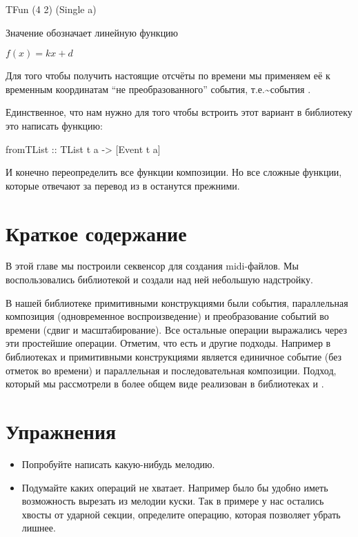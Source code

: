 \begin{code}
TFun (4 2) (Single a)
\end{code}

Значение  обозначает линейную функцию

$f(x) = k x + d$

Для того чтобы получить настоящие отсчёты по времени мы применяем её к
временным координатам ``не преобразованного'' события,
т.е.\textasciitilde{}события .

Единственное, что нам нужно для того чтобы встроить этот вариант в
библиотеку это написать функцию:


\begin{code}
fromTList :: TList t a -> [Event t a]
\end{code}

И конечно переопределить все функции композиции. Но все сложные функции,
которые отвечают за перевод из  в  останутся
прежними.

\section{Краткое содержание}

В этой главе мы построили секвенсор для создания midi-файлов. Мы
воспользовались библиотекой  и создали над ней небольшую
надстройку.

В нашей библиотеке примитивными конструкциями были события, параллельная
композиция (одновременное воспроизведение) и преобразование событий во
времени (сдвиг и масштабирование). Все остальные операции выражались
через эти простейшие операции. Отметим, что есть и другие подходы.
Например в библиотеках  и  примитивными
конструкциями является единичное событие (без отметок во времени) и
параллельная и последовательная композиции. Подход, который мы
рассмотрели в более общем виде реализован в библиотеках
 и .

\section{Упражнения}

\begin{itemize}
\item
  Попробуйте написать какую-нибудь мелодию.
\item
  Подумайте каких операций не хватает. Например было бы удобно иметь
  возможность вырезать из мелодии куски. Так в примере у нас остались
  хвосты от ударной секции, определите операцию, которая позволяет
  убрать лишнее.
\end{itemize}
